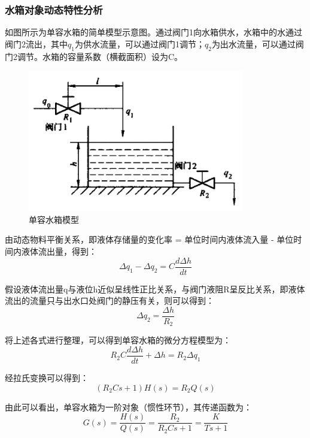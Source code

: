 \documentclass[UTF8]{article}
\begin{document}
\subsubsection{水箱对象动态特性分析}
如图所示为单容水箱的简单模型示意图。通过阀门1向水箱供水，水箱中的水通过阀门2流出，其中$q_1$为供水流量，可以通过阀门1调节；$q_2$为出水流量，可以通过阀门2调节。水箱的容量系数（横截面积）设为C。
\begin{figure}[H]
    \centering %
    \includegraphics[width=.6\textwidth]{figure/单容水箱模型.png} 
    \caption{单容水箱模型} %
\end{figure}

由动态物料平衡关系，即液体存储量的变化率 = 单位时间内液体流入量 - 单位时间内液体流出量，得到：
\begin{equation*}
	\Delta q_1 - \Delta q_2 = C\frac{d\Delta h}{dt}
\end{equation*}

假设液体流出量q与液位h近似呈线性正比关系，与阀门液阻R呈反比关系，即液体流出的流量只与出水口处阀门的静压有关，则可以得到：
\begin{equation*}
	\Delta q_2 = \frac{\Delta h}{R_2}
\end{equation*}

将上述各式进行整理，可以得到单容水箱的微分方程模型为：
\begin{equation*}
	R_2C\frac{d \Delta h}{dt} + \Delta h = R_2 \Delta q_1
\end{equation*}

经拉氏变换可以得到：
\begin{equation*}
	(R_2Cs + 1)H(s) = R_2Q(s)
\end{equation*}

由此可以看出，单容水箱为一阶对象（惯性环节），其传递函数为：
\begin{equation*}
	G(s) = \frac{H(s)}{Q(s)} = \frac{R_2}{R_2Cs + 1} = \frac{K}{Ts + 1}
\end{equation*}
\end{document}
